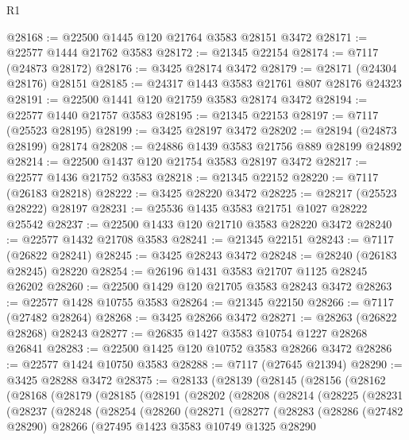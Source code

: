 \begin{lexlean}{R1}
\begin{coremodule}
@28168 := @22500 @1445 @120 @21764 @3583 @28151 @3472
@28171 := @22577 @1444 @21762 @3583
@28172 := @21345 @22154
@28174 := @7117 (@24873 @28172)
@28176 := @3425 @28174 @3472
@28179 := @28171 (@24304 @28176) @28151
@28185 := @24317 @1443 @3583 @21761 @807 @28176 @24323
@28191 := @22500 @1441 @120 @21759 @3583 @28174 @3472
@28194 := @22577 @1440 @21757 @3583
@28195 := @21345 @22153
@28197 := @7117 (@25523 @28195)
@28199 := @3425 @28197 @3472
@28202 := @28194 (@24873 @28199) @28174
@28208 := @24886 @1439 @3583 @21756 @889 @28199 @24892
@28214 := @22500 @1437 @120 @21754 @3583 @28197 @3472
@28217 := @22577 @1436 @21752 @3583
@28218 := @21345 @22152
@28220 := @7117 (@26183 @28218)
@28222 := @3425 @28220 @3472
@28225 := @28217 (@25523 @28222) @28197
@28231 := @25536 @1435 @3583 @21751 @1027 @28222 @25542
@28237 := @22500 @1433 @120 @21710 @3583 @28220 @3472
@28240 := @22577 @1432 @21708 @3583
@28241 := @21345 @22151
@28243 := @7117 (@26822 @28241)
@28245 := @3425 @28243 @3472
@28248 := @28240 (@26183 @28245) @28220
@28254 := @26196 @1431 @3583 @21707 @1125 @28245 @26202
@28260 := @22500 @1429 @120 @21705 @3583 @28243 @3472
@28263 := @22577 @1428 @10755 @3583
@28264 := @21345 @22150
@28266 := @7117 (@27482 @28264)
@28268 := @3425 @28266 @3472
@28271 := @28263 (@26822 @28268) @28243
@28277 := @26835 @1427 @3583 @10754 @1227 @28268 @26841
@28283 := @22500 @1425 @120 @10752 @3583 @28266 @3472
@28286 := @22577 @1424 @10750 @3583
@28288 := @7117 (@27645 @21394)
@28290 := @3425 @28288 @3472
@28375 := @28133
    (@28139
      (@28145
        (@28156
          (@28162
            (@28168
              (@28179
                (@28185
                  (@28191
                    (@28202
                      (@28208
                        (@28214
                          (@28225
                            (@28231
                              (@28237
                                (@28248
                                  (@28254
                                    (@28260
                                      (@28271
                                        (@28277
                                          (@28283
                                            (@28286
                                              (@27482 @28290)
                                              @28266
                                              (@27495
                                                @1423
                                                @3583
                                                @10749
                                                @1325
                                                @28290

\end{coremodule}
\end{lexlean}
